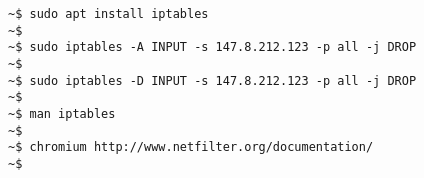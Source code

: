 \documentclass[varwidth=40em,crop]{standalone}
\begin{document}
\begin{verbatim}
~$ sudo apt install iptables
~$ 
~$ sudo iptables -A INPUT -s 147.8.212.123 -p all -j DROP
~$ 
~$ sudo iptables -D INPUT -s 147.8.212.123 -p all -j DROP
~$ 
~$ man iptables
~$ 
~$ chromium http://www.netfilter.org/documentation/
~$ 
\end{verbatim}
\end{document}
